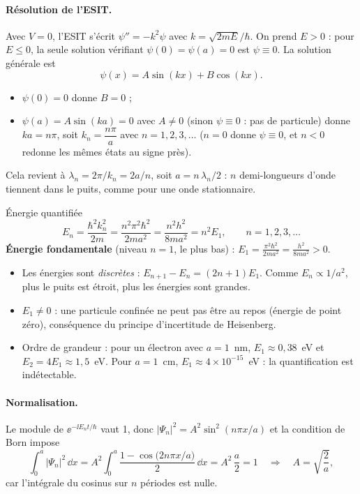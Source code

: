 \paragraph{Résolution de l'ESIT.} Avec $V=0$, l'ESIT s'écrit
$\psi''=-k^2\psi$ avec $k=\sqrt{2mE}/\hbar$. On prend $E>0$ : pour $E\le0$, la seule
solution vérifiant $\psi(0)=\psi(a)=0$ est $\psi\equiv0$. La solution générale est
\[
  \psi(x)=A\sin(kx)+B\cos(kx).
\]
\begin{itemize}[nosep]
  \item $\psi(0)=0$ donne $B=0$ ;
  \item $\psi(a)=A\sin(ka)=0$ avec $A\neq0$ (sinon $\psi\equiv0$ : pas de
        particule) donne $ka=n\pi$, soit
        $k_n=\dfrac{n\pi}{a}$ avec $n=1,2,3,\dots$
        ($n=0$ donne $\psi\equiv0$, et $n<0$ redonne les mêmes états au signe près).
\end{itemize}
Cela revient à $\lambda_n=2\pi/k_n=2a/n$, soit $a=n\,\lambda_n/2$ : $n$ demi-longueurs
d'onde tiennent dans le puits, comme pour une onde stationnaire.

\begin{resultat}{Énergie quantifiée}
\[
  E_n=\frac{\hbar^2k_n^2}{2m}=\frac{n^2\pi^2\hbar^2}{2ma^2}=\frac{n^2h^2}{8ma^2}=n^2E_1,
  \qquad n=1,2,3,\dots
\]
\textbf{Énergie fondamentale} (niveau $n=1$, le plus bas) :
$\displaystyle E_1=\frac{\pi^2\hbar^2}{2ma^2}=\frac{h^2}{8ma^2}>0$.
\end{resultat}

\begin{remarque}
\begin{itemize}[nosep]
  \item Les énergies sont \emph{discrètes} : $E_{n+1}-E_n=(2n+1)E_1$. Comme
        $E_n\propto1/a^2$, plus le puits est étroit, plus les énergies sont grandes.
  \item $E_1\neq0$ : une particule confinée ne peut pas être au repos (énergie de
        point zéro), conséquence du principe d'incertitude de Heisenberg.
  \item Ordre de grandeur : pour un électron avec $a=1$~nm,
        $E_1\approx0{,}38$~eV et $E_2=4E_1\approx1{,}5$~eV. Pour $a=1$~cm,
        $E_1\approx4\times10^{-15}$~eV : la quantification est indétectable.
\end{itemize}
\end{remarque}

\paragraph{Normalisation.} Le module de $\ee^{-\ii E_nt/\hbar}$ vaut 1, donc
$|\Psi_n|^2=A^2\sin^2(n\pi x/a)$ et la condition de Born impose
\[
  \int_0^a|\Psi_n|^2\,\dd x
  = A^2\int_0^a\frac{1-\cos\!\big(2n\pi x/a\big)}{2}\,\dd x
  = A^2\,\frac{a}{2}=1
  \quad\Longrightarrow\quad A=\sqrt{\frac{2}{a}},
\]
car l'intégrale du cosinus sur $n$ périodes est nulle.

